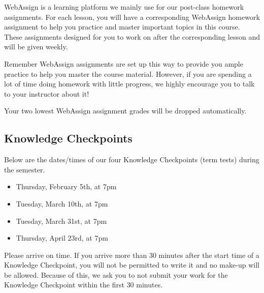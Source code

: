 \documentclass[12pt]{article}
\begin{document}
        WebAssign is a learning platform we mainly use for our post-class homework assignments. For each lesson, you will have a corresponding WebAssign homework assignment to help you practice and master important topics in this course. These assignments designed for you to work on after the corresponding lesson and will be given weekly.
        
        
        
        Remember WebAssign assignments are set up this way to provide you ample practice to help you master the course material. However, if you are spending a lot of time doing homework with little progress, we highly encourage you to talk to your instructor about it!
        	
        Your two lowest WebAssign assignment grades will be dropped automatically.
        \newpage
        \subsection{Knowledge Checkpoints}
        
        Below are the dates/times of our four Knowledge Checkpoints (term tests) during the semester.
        
        \begin{itemize}
            \item Thursday, February 5th, at 7pm
            \item Tuesday, March 10th, at 7pm
            \item Tuesday, March 31st, at 7pm
            \item Thursday, April 23rd, at 7pm
        \end{itemize}


        Please arrive on time. If you arrive more than 30 minutes after the start time of a Knowledge Checkpoint, you will not be permitted to write it and no make-up will be allowed. Because of this, we ask you to not submit your work for the Knowledge Checkpoint within the first 30 minutes.
        
\end{document}
